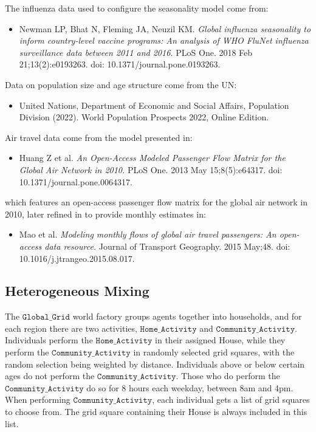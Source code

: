 \documentclass[10pt,letterpaper]{article}
\begin{document}
\noindent The influenza data used to configure the seasonality model come from:

\begin{itemize}
\item[] Newman LP, Bhat N, Fleming JA, Neuzil KM. \textit{Global influenza seasonality to inform country-level vaccine programs: An analysis of WHO FluNet influenza surveillance data between 2011 and 2016.} PLoS One. 2018 Feb 21;13(2):e0193263. doi: 10.1371/journal.pone.0193263.
\end{itemize}

\noindent Data on population size and age structure come from the UN:

\begin{itemize}
\item[] United Nations, Department of Economic and Social Affairs, Population Division (2022). World Population Prospects 2022, Online Edition.
\end{itemize}

\noindent Air travel data come from the model presented in:

\begin{itemize}
\item[] Huang Z et al. \textit{An Open-Access Modeled Passenger Flow Matrix for the Global Air Network in 2010.} PLoS One. 2013 May 15;8(5):e64317. doi: 10.1371/journal.pone.0064317.
\end{itemize}

\noindent which features an open-access passenger flow matrix for the global air network in 2010, later refined in to provide monthly estimates in:

\begin{itemize}
\item[] Mao et al. \textit{Modeling monthly flows of global air travel passengers: An open-access data resource.} Journal of Transport Geography. 2015 May;48. doi: 10.1016/j.jtrangeo.2015.08.017.
\end{itemize}

\subsection{Heterogeneous Mixing}

The $\texttt{Global{\_}Grid}$ world factory groups agents together into households, and for each region there are two activities, $\texttt{Home{\_}Activity}$ and $\texttt{Community{\_}Activity}$. Individuals perform the
$\texttt{Home{\_}Activity}$ in their assigned House, while they perform the $\texttt{Community{\_}Activity}$ in randomly selected grid squares, with the random selection being weighted by distance. Individuals above or below certain ages do not perform the $\texttt{Community{\_}Activity}$. Those who do perform the $\texttt{Community{\_}Activity}$ do so for 8 hours each weekday, between 8am and 4pm. When performing $\texttt{Community{\_}Activity}$, each individual gets a list of grid squares to choose from. The grid square containing their House is always included in this list.
\end{document}
